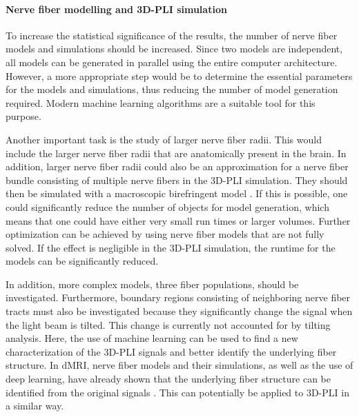 \paragraph{Nerve fiber modelling and \ac{3D-PLI} simulation}
% 
To increase the statistical significance of the results, the number of nerve fiber models and simulations should be increased.
Since two models are independent, all models can be generated in parallel using the entire computer architecture.
However, a more appropriate step would be to determine the essential parameters for the models and simulations, thus reducing the number of model generation required.
Modern machine learning algorithms are a suitable tool for this purpose.
\par
% 
Another important task is the study of larger nerve fiber radii.
This would include the larger nerve fiber radii that are anatomically present in the brain.
In addition, larger nerve fiber radii could also be an approximation for a nerve fiber bundle consisting of multiple nerve fibers in the \ac{3D-PLI} simulation.
They should then be simulated with a macroscopic birefringent model \cite{Menzel2015}.
If this is possible, one could significantly reduce the number of objects for model generation, which means that one could have either very small run times or larger volumes.
Further optimization can be achieved by using nerve fiber models that are not fully solved.
If the effect is negligible in the \ac{3D-PLI} simulation, the runtime for the models can be significantly reduced.
\par
% 
In addition, more complex models, \eg{} three fiber populations, should be investigated.
Furthermore, boundary regions consisting of neighboring nerve fiber tracts must also be investigated because they significantly change the signal when the light beam is tilted.
This change is currently not accounted for by tilting analysis.
Here, the use of machine learning can be used to find a new characterization of the \ac{3D-PLI} signals and better identify the underlying fiber structure.
In \ac{dMRI}, nerve fiber models and their simulations, as well as the use of deep learning, have already shown that the underlying fiber structure can be identified from the original signals \cite{ginsburgerDis2019}.
This can potentially be applied to \ac{3D-PLI} in a similar way.